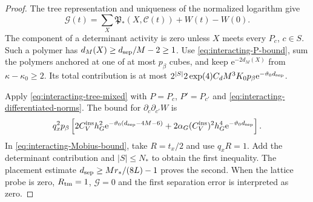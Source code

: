\begin{proof}
The tree representation and uniqueness of the
normalized logarithm give
\[
 \mathcal G(t)=\sum_X\mathfrak P_*(X,\mathscr C(t))+W(t)-W(0).
\]
The component of a determinant activity is zero
unless $X$ meets every $P_c$, $c\in S$.
Such a polymer has
$d_M(X)\ge d_{\rm sep}/M-2\ge1$.
Use \eqref{eq:interacting-P-bound}, sum the
polymers anchored at one of at most $p_\beta$
cubes, and keep $\mathrm e^{-2d_M(X)}$ from
$\kappa-\kappa_0\ge2$.
Its total contribution is at most
$2^{|S|}2\exp(4)C_dM^3K_0p_\beta
\mathrm e^{-\vartheta_0d_{\rm sep}}$.

Apply \eqref{eq:interacting-tree-mixed}
with $P=P_c$, $P'=P_{c'}$ and
\eqref{eq:interacting-differentiated-norms}.
The bound for $\partial_c\partial_{c'}W$ is
\[
 q_x^2p_\beta\left[
       2C_V^{\mathrm{ins}}h_G^2\mathrm e^{-\vartheta_0(d_{\rm sep}-4M-6)}
           +2\alpha_G(C_V^{\mathrm{ins}})^2h_G^4\mathrm e^{-\vartheta_0d_{\rm sep}}\right].
\]
In \eqref{eq:interacting-Mobius-bound}, take
$R=t_x/2$ and use $q_xR=1$.
Add the determinant contribution and
$|S|\le N_*$ to obtain the first inequality.
The placement estimate
$d_{\rm sep}\ge Mr_*/(8L)-1$
proves the second.
When the lattice probe is zero,
$R_{\rm tm}=1$, $\mathcal G=0$ and the
first separation error is interpreted as zero.
\end{proof}

